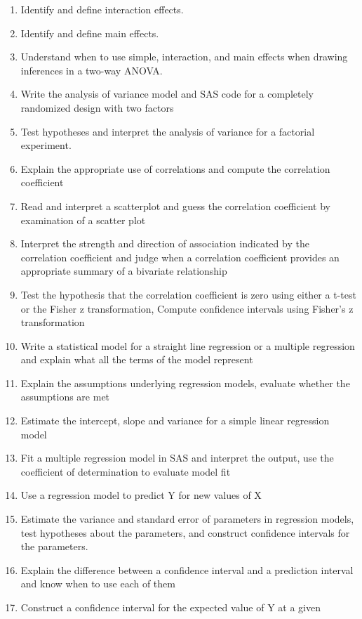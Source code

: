 \documentclass[]{book}
\begin{document}
\begin{enumerate}
\item
  Identify and define interaction effects.
\item
  Identify and define main effects.
\item
  Understand when to use simple, interaction, and main effects when
  drawing inferences in a two-way ANOVA.
\item
  Write the analysis of variance model and SAS code for a completely
  randomized design with two factors
\item
  Test hypotheses and interpret the analysis of variance for a factorial
  experiment.
\item
  Explain the appropriate use of correlations and compute the
  correlation coefficient
\item
  Read and interpret a scatterplot and guess the correlation coefficient
  by examination of a scatter plot
\item
  Interpret the strength and direction of association indicated by the
  correlation coefficient and judge when a correlation coefficient
  provides an appropriate summary of a bivariate relationship
\item
  Test the hypothesis that the correlation coefficient is zero using
  either a t-test or the Fisher z transformation, Compute confidence
  intervals using Fisher's z transformation
\item
  Write a statistical model for a straight line regression or a multiple
  regression and explain what all the terms of the model represent
\item
  Explain the assumptions underlying regression models, evaluate whether
  the assumptions are met
\item
  Estimate the intercept, slope and variance for a simple linear
  regression model
\item
  Fit a multiple regression model in SAS and interpret the output, use
  the coefficient of determination to evaluate model fit
\item
  Use a regression model to predict Y for new values of X
\item
  Estimate the variance and standard error of parameters in regression
  models, test hypotheses about the parameters, and construct confidence
  intervals for the parameters.
\item
  Explain the difference between a confidence interval and a prediction
  interval and know when to use each of them
\item
  Construct a confidence interval for the expected value of Y at a given

\end{enumerate}
\end{document}
